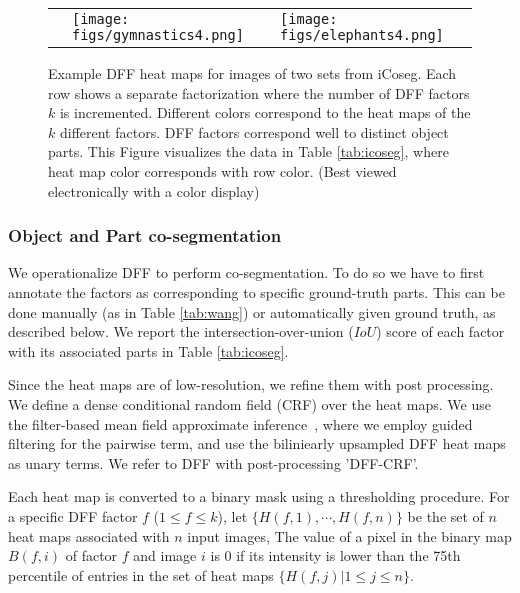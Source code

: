 \documentclass[runningheads]{llncs}
\begin{document}
\begin{figure}[t]
\begin{tabular}{lcc}
			\rotatebox[origin=c]{90}{\footnotesize$k\!=\!4$}\normalsize& \multicolumn{1}{l|}{\begin{minipage}{0.48\textwidth}\texttt{[image: figs/gymnastics4.png]}\end{minipage}}  & \multicolumn{1}{l}{\begin{minipage}{0.48\textwidth}\texttt{[image: figs/elephants4.png]}\end{minipage}}  \\
			

		\end{tabular}
		
		\caption{Example DFF heat maps for images of two sets from iCoseg. Each row shows a separate factorization where the number of DFF factors $k$ is incremented. Different colors correspond to the heat maps of the $k$ different factors. DFF factors correspond well to distinct object parts. This Figure visualizes the data in Table \ref{tab:icoseg}, where heat map color corresponds with row color. (Best viewed electronically with a color display)}  \label{fig:icoseg2}
		
	\end{figure}
	
	\subsubsection{Object and Part co-segmentation}
	We operationalize DFF to perform co-segmentation. To do so we have to first annotate the factors as corresponding to specific ground-truth parts. This can be done manually (as in Table \ref{tab:wang}) or automatically given ground truth, as described below. We report the intersection-over-union ($IoU$) score of each factor with its associated parts in Table \ref{tab:icoseg}.
	
	Since the heat maps are of low-resolution, we refine them with post processing. We define a dense conditional random field (CRF) over the heat maps. We use the filter-based mean field approximate inference~\cite{krahenbuhl2011efficient}, where we employ guided filtering \cite{he2013guided} for the pairwise term, and use the biliniearly upsampled DFF heat maps as unary terms. We refer to DFF with post-processing 'DFF-CRF'.
	
	Each heat map is converted to a binary mask using a thresholding procedure. For a specific DFF factor $f$ ($1\leq f\leq k$), let $\{H(f, 1),\cdots, H(f,n)\}$ be the set of $n$ heat maps associated with $n$ input images, The value of a pixel in the binary map $B(f,i)$ of factor $f$ and image $i$ is 0 if its intensity is lower than the 75th percentile of entries in the set of heat maps $\{H(f,j) | 1\leq j\leq n\}$.
	
\end{document}
